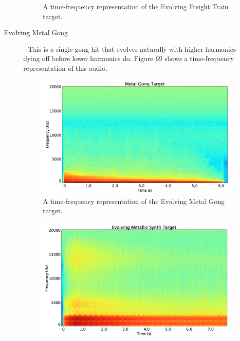 \documentclass[12pt]{report} 	%
\numberwithin{figure}{chapter}
\numberwithin{table}{chapter}
\numberwithin{equation}{chapter}
\begin{document}
\begin{flushleft}
\begin{description}
\begin{figure}[h!]
\begin{center}
\caption[Evolving freight train time-frequency representation]{A time-frequency representation of the Evolving Freight Train target.}
\end{center}
\end{figure}
\item[Evolving Metal Gong] - This is a single gong hit that evolves naturally with higher harmonics dying off before lower harmonics do. Figure 69 shows a time-frequency representation of this audio.
\begin{figure}[h!]
\begin{center}
\includegraphics[scale=0.34]{MetalGongTargetSTFT}
\caption[Evolving metal gong time-frequency representation]{A time-frequency representation of the Evolving Metal Gong target.}
\end{center}
\vspace{24pt}
\end{figure}
\begin{figure}[h!]
\begin{center}
\includegraphics[scale=0.34]{EvolvingMetallicSynthTargetSTFT}

\end{center}
\end{figure}
\end{description}
\end{flushleft}
\end{document}

